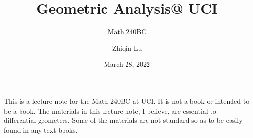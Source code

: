 \documentclass[lang=en,11pt,green,fancy]{elegantbook}
\title{Geometric Analysis@ UCI}
\subtitle{Math 240BC}
\author{Zhiqin Lu}
\institute{University of California, Irvine}
\date{March 28, 2022}
\numberwithin{equation}{chapter}
\begin{document}
\maketitle
\frontmatter
\tableofcontents
\mainmatter

\newpage




















\nocite{*}

\printbibliography


\newpage


\begin{remark}
This is a lecture note for the Math 240BC at UCI. It is not a book or intended to be a book. The materials in this lecture note, I believe, are essential to differential geometers. Some of the materials are not standard so as to be easily found in  any text books.
\end{remark}

\vspace{2in}
\end{document}
